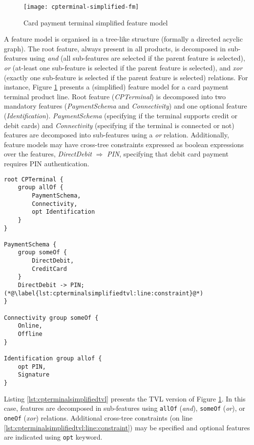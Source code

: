 \begin{figure}
	\centering
	\texttt{[image: cpterminal-simplified-fm]}
	\caption{Card payment terminal simplified feature model}
	\label{fig:cpterminalsimplifiedfm}
\end{figure}

A \gls{feature model} is organised in a tree-like structure (formally a directed acyclic graph). The root feature, always present in all products, is decomposed in sub-features using \textit{and} (all sub-features are selected if the parent feature is selected), \textit{or} (at-least one sub-feature is selected if the parent feature is selected), and \textit{xor} (exactly one sub-feature is selected if the parent feature is selected) relations. For instance, Figure \ref{fig:cpterminalsimplifiedfm} presents a (simplified) feature model for a card payment terminal product line. Root feature (\textit{CPTerminal}) is decomposed into two mandatory features (\textit{Pay\-ment\-Sche\-ma} and \textit{Con\-necti\-vi\-ty}) and one optional feature (\textit{Iden\-ti\-fica\-tion}). \textit{Pay\-ment\-Sche\-ma} (specifying if the terminal supports credit or debit cards) and \textit{Con\-necti\-vi\-ty} (specifying if the terminal is connected or not) features are decomposed into sub-features using a \textit{or} relation. Additionally, feature models may have cross-tree constraints expressed as boolean expressions over the features, \eg  \textit{Di\-rect\-De\-bit} $\Rightarrow$ \textit{PIN}, specifying that debit card payment requires PIN authentication.

\begin{lstlisting}[language=TVL,
float,
label=lst:cpterminalsimplifiedtvl,
caption={Card payment terminal simplified feature model in TVL format}]
root CPTerminal {
	group allOf {
		PaymentSchema,
		Connectivity,
		opt Identification
	}
} 

PaymentSchema {
	group someOf {
		DirectDebit,
		CreditCard
	}
	DirectDebit -> PIN; (*@\label{lst:cpterminalsimplifiedtvl:line:constraint}@*)
} 

Connectivity group someOf {
	Online,
	Offline
}

Identification group allof {
	opt PIN,
	Signature
}
\end{lstlisting}

Listing \ref{lst:cpterminalsimplifiedtvl} presents the TVL version of Figure \ref{fig:cpterminalsimplifiedfm}. In this case, features are decomposed in sub-features using \texttt{allOf} (\textit{and}), \texttt{someOf} (\textit{or}), or \texttt{oneOf} (\textit{xor}) relations. Additional cross-tree constraints (on line \ref{lst:cpterminalsimplifiedtvl:line:constraint}) may be specified and optional features are indicated using \texttt{opt} keyword.

